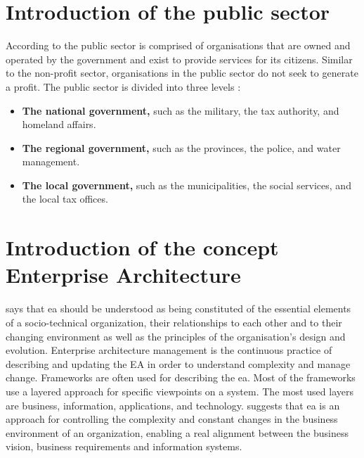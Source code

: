 \section{Introduction of the public sector}
\label{sec:intropublicsector}
According to \textcite{PrivacySense2016} the public sector is comprised of organisations that are owned and operated by the government and exist to provide services for its citizens. Similar to the non-profit sector, organisations in the public sector do not seek to generate a profit. The public sector is divided into three levels \parencite{PrivacySense2016}:

\begin{itemize}
	\item{\textbf{The national government,} such as the military, the tax authority, and homeland affairs.}
	\item{\textbf{The regional government,} such as the provinces, the police, and water management.}
	\item{\textbf{The local government,} such as the municipalities, the social services, and the local tax offices.}
\end{itemize}

\section{Introduction of the concept Enterprise Architecture}
\label{introea}

\textcite[p. 104]{Lapalme2016} says that \acrshort{ea} should be understood as being constituted of the essential elements of a socio-technical organization, their relationships to each other and to their changing environment as well as the principles of the organisation’s design and evolution. Enterprise architecture management is the continuous practice of describing and updating the EA in order to understand complexity and manage change. Frameworks are often used for describing the \acrshort{ea}. Most of the frameworks use a layered approach for specific viewpoints on a system. The most used layers are business, information, applications, and technology. \textcite[p. 189]{Ylimaeki2005} suggests that \acrshort{ea} is an approach for controlling the complexity and constant changes in the business environment of an organization, enabling a real alignment between the business vision, business requirements and information systems.

